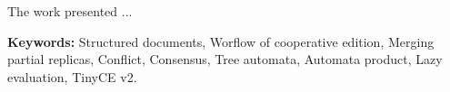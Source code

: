 \let\oldprintchaptertitle=\printchaptertitle
\renewcommand{\printchaptertitle}[1]{%
	\vspace*{-75pt}
	\oldprintchaptertitle{#1}
}%
\let\printchaptertitle=\oldprintchaptertitle
The work presented ...

\vspace{1cm}
\noindent\textbf{Keywords:} Structured documents, Worflow of cooperative edition, Merging partial replicas, Conflict, Consensus, Tree automata, Automata product, Lazy evaluation, TinyCE v2.

\myCleanStarChapterEnd
